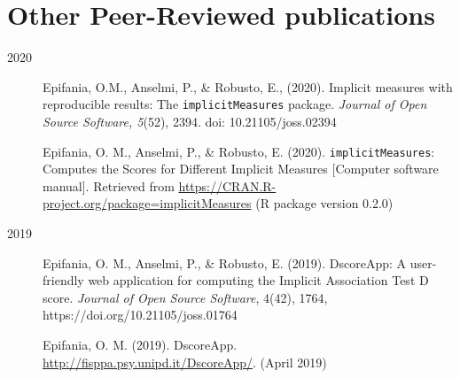 \documentclass[letterpaper,12pt]{article}
\begin{document}
\section{Other Peer-Reviewed publications}

\begin{description}

	
	\item[2020] 
\item[] Epifania, O.M., Anselmi, P., \& Robusto, E., (2020). Implicit measures with reproducible results: The \texttt{implicitMeasures} package. \emph{Journal of Open Source Software, 5}(52), 2394. doi: 10.21105/joss.02394

\item[] Epifania, O. M., Anselmi, P., \& Robusto, E. (2020). \texttt{implicitMeasures}: Computes the Scores for Different Implicit Measures [Computer software manual]. Retrieved from
\href{https://CRAN.R-project.org/package=implicitMeasures}{https://CRAN.R-project.org/package=implicitMeasures} (R package version 0.2.0)

	\item[2019] 
\item[] Epifania, O. M., Anselmi, P., \& Robusto, E. (2019). DscoreApp: A user-friendly web application for computing the Implicit Association Test D score. \emph{Journal of Open Source Software}, 4(42), 1764, https://doi.org/10.21105/joss.01764

\item[] Epifania, O. M. (2019). DscoreApp. \href{http://fisppa.psy.unipd.it/DscoreApp/}{http://fisppa.psy.unipd.it/DscoreApp/}.  (April 2019)

\end{description}
\end{document}
